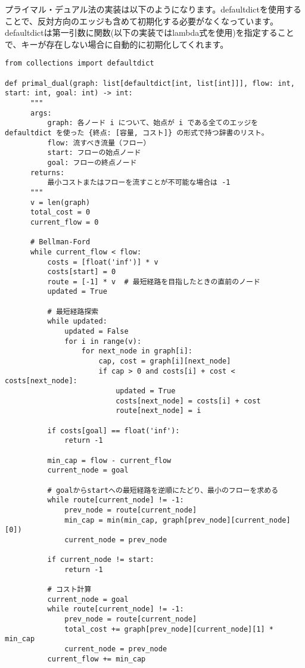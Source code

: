 \documentclass{jlreq}
\begin{document}
\newpage

プライマル・デュアル法の実装は以下のようになります。defaultdictを使用することで、反対方向のエッジも含めて初期化する必要がなくなっています。
defaultdictは第一引数に関数(以下の実装ではlambda式を使用)を指定することで、キーが存在しない場合に自動的に初期化してくれます。

\begin{lstlisting}[caption=プライマル・デュアル法の実装, label=primal_dual, frame=TRBL, label={primal_dual}]
from collections import defaultdict

def primal_dual(graph: list[defaultdict[int, list[int]]], flow: int, start: int, goal: int) -> int:
      """
      args:
          graph: 各ノード i について、始点が i である全てのエッジを defaultdict を使った {終点: [容量, コスト]} の形式で持つ辞書のリスト。
          flow: 流すべき流量（フロー）
          start: フローの始点ノード
          goal: フローの終点ノード
      returns:
          最小コストまたはフローを流すことが不可能な場合は -1
      """
      v = len(graph)
      total_cost = 0
      current_flow = 0
  
      # Bellman-Ford 
      while current_flow < flow:
          costs = [float('inf')] * v
          costs[start] = 0
          route = [-1] * v  # 最短経路を目指したときの直前のノード
          updated = True
  
          # 最短経路探索
          while updated:
              updated = False
              for i in range(v):
                  for next_node in graph[i]:
                      cap, cost = graph[i][next_node]
                      if cap > 0 and costs[i] + cost < costs[next_node]:
                          updated = True
                          costs[next_node] = costs[i] + cost
                          route[next_node] = i
  
          if costs[goal] == float('inf'):
              return -1
  
          min_cap = flow - current_flow
          current_node = goal
  
          # goalからstartへの最短経路を逆順にたどり、最小のフローを求める
          while route[current_node] != -1:
              prev_node = route[current_node]
              min_cap = min(min_cap, graph[prev_node][current_node][0])
              current_node = prev_node
          
          if current_node != start:
              return -1
          
          # コスト計算
          current_node = goal
          while route[current_node] != -1:
              prev_node = route[current_node]
              total_cost += graph[prev_node][current_node][1] * min_cap
              current_node = prev_node
          current_flow += min_cap
  

\end{lstlisting}
\end{document}
